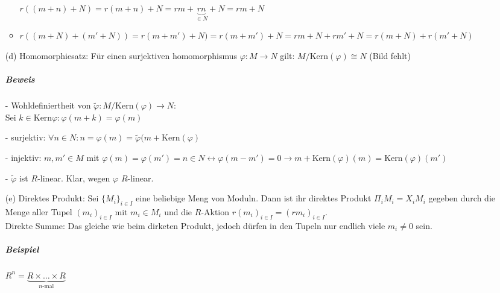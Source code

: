 \documentclass{article}
\begin{document}
\begin{enumerate}
\begin{itemize}
					$r((m+n)+N)=r(m+n) + N= rm + \underbrace{rn}_{\in N} + N = rm + N$
				\item $r((m+N) + (m' + N ) ) = r(m+m')+N) = r(m+m') + N = rm + N + rm' + N = r(m+N) + r(m'+N)$
			\end{itemize}
		\item[(d)] Homomorphiesatz: Für einen surjektiven homomorphismus $\varphi: M \rightarrow N$ gilt: 
			$M/\mbox{Kern}(\varphi) \cong N$  (Bild fehlt)
			\subparagraph{Beweis}
				\item[-]  Wohldefiniertheit von $\tilde{\varphi}: M/\mbox{Kern}(\varphi) \rightarrow N$:\\
					Sei $k \in \mbox{Kern}\varphi: \varphi(m+k) = \varphi(m)$
				\item[-] surjektiv: $\forall n \in N: n = \varphi(m) = \tilde{\varphi}(m+ \mbox{Kern}(\varphi)$ 
				\item[-] injektiv: $m, m' \in M$ mit $\varphi(m) = \varphi(m') = n \in N \leftrightarrow 
					\varphi(m-m') = 0 \rightarrow m + \mbox{Kern}(\varphi)(m) = \mbox{Kern}(\varphi)(m')$
				\item[-] $\tilde{\varphi}$ ist $R$-linear. Klar, wegen $\varphi$ $R$-linear.
		\item[(e)] Direktes Produkt: Sei ${\{M_{i}\}}_{i \in I}$ eine beliebige Meng von Moduln. Dann ist ihr direktes Produkt 
			$\Pi_i M_i = X_i M_i$ gegeben durch die Menge aller Tupel ${(m_i)}_{i \in I}$ mit $m_i \in M_i$ und die $R$-Aktion 
			${r(m_i)}_{i \in I} = {(rm_i)}_{i \in I}$.\\
			Direkte Summe: Das gleiche wie beim dirketen Produkt, jedoch dürfen in den Tupeln nur endlich viele $m_i \neq 0$ sein.
				\subparagraph{Beispiel}
					$R^n = \underbrace{R \times \ldots \times R}_{n \mbox{-mal}}$
	\end{enumerate} 
	
\end{document}
